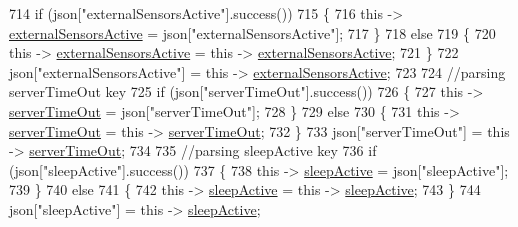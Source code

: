 \begin{DoxyCode}
714             \textcolor{keywordflow}{if} (json[\textcolor{stringliteral}{"externalSensorsActive"}].success())
715             \{
716                 \textcolor{keyword}{this} -> \hyperlink{classCoolBoard_a638b00b76aeb819ecfd4c10b8cdd7bb7}{externalSensorsActive} = json[\textcolor{stringliteral}{"externalSensorsActive"}];
717             \}
718             \textcolor{keywordflow}{else}
719             \{
720                 \textcolor{keyword}{this} -> \hyperlink{classCoolBoard_a638b00b76aeb819ecfd4c10b8cdd7bb7}{externalSensorsActive} = \textcolor{keyword}{this} -> 
      \hyperlink{classCoolBoard_a638b00b76aeb819ecfd4c10b8cdd7bb7}{externalSensorsActive};
721             \}
722             json[\textcolor{stringliteral}{"externalSensorsActive"}] = \textcolor{keyword}{this} -> \hyperlink{classCoolBoard_a638b00b76aeb819ecfd4c10b8cdd7bb7}{externalSensorsActive};
723 
724             \textcolor{comment}{//parsing serverTimeOut key}
725             \textcolor{keywordflow}{if} (json[\textcolor{stringliteral}{"serverTimeOut"}].success())
726             \{
727                 \textcolor{keyword}{this} -> \hyperlink{classCoolBoard_a7a8d8d3d316220cdd049cd63c1aa8fe6}{serverTimeOut} = json[\textcolor{stringliteral}{"serverTimeOut"}];
728             \}
729             \textcolor{keywordflow}{else}
730             \{
731                 \textcolor{keyword}{this} -> \hyperlink{classCoolBoard_a7a8d8d3d316220cdd049cd63c1aa8fe6}{serverTimeOut} = \textcolor{keyword}{this} -> \hyperlink{classCoolBoard_a7a8d8d3d316220cdd049cd63c1aa8fe6}{serverTimeOut};
732             \}
733             json[\textcolor{stringliteral}{"serverTimeOut"}] = \textcolor{keyword}{this} -> \hyperlink{classCoolBoard_a7a8d8d3d316220cdd049cd63c1aa8fe6}{serverTimeOut};
734             
735             \textcolor{comment}{//parsing sleepActive key}
736             \textcolor{keywordflow}{if} (json[\textcolor{stringliteral}{"sleepActive"}].success())
737             \{
738                 \textcolor{keyword}{this} -> \hyperlink{classCoolBoard_a0a51b2287139f66c738101fb53139230}{sleepActive} = json[\textcolor{stringliteral}{"sleepActive"}];
739             \}
740             \textcolor{keywordflow}{else}
741             \{
742                 \textcolor{keyword}{this} -> \hyperlink{classCoolBoard_a0a51b2287139f66c738101fb53139230}{sleepActive} = \textcolor{keyword}{this} -> \hyperlink{classCoolBoard_a0a51b2287139f66c738101fb53139230}{sleepActive};
743             \}
744             json[\textcolor{stringliteral}{"sleepActive"}] = \textcolor{keyword}{this} -> \hyperlink{classCoolBoard_a0a51b2287139f66c738101fb53139230}{sleepActive};

\end{DoxyCode}
